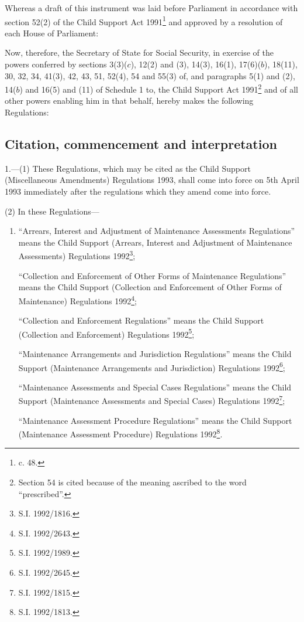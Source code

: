 \documentclass[12pt,a4paper]{article}
\title{\regstitle}
\author{S.I. 1993 No. 913}
\date{Made 29th March 1993\\Coming into force 5th April 1993}
\begin{document}
\maketitle

\noindent
Whereas a draft of this instrument was laid before Parliament in accordance with section 52(2) of the Child Support Act 1991\footnote{ c. 48.} and approved by a resolution of each House of Parliament: 

Now, therefore, the Secretary of State for Social Security, in exercise of the powers conferred by sections 3(3)($c$), 12(2) and (3), 14(3), 16(1), 17(6)($b$), 18(11), 30, 32, 34, 41(3), 42, 43, 51, 52(4), 54 and 55(3) of, and paragraphs 5(1) and (2), 14($b$) and 16(5) and (11) of Schedule 1 to, the Child Support Act 1991\footnote{\frenchspacing Section 54 is cited because of the meaning ascribed to the word “prescribed”.} and of all other powers enabling him in that behalf, hereby makes the following Regulations:


{\sloppy

\tableofcontents

}

\setcounter{secnumdepth}{-2}

\subsection[1. Citation, commencement and interpretation]{Citation, commencement and interpretation}

1.—(1) These Regulations, which may be cited as the Child Support (Miscellaneous Amendments) Regulations 1993, shall come into force on 5th April 1993 immediately after the regulations which they amend come into force.

(2) In these Regulations---
\begin{enumerate}\item[]
“Arrears, Interest and Adjustment of Maintenance Assessments Regulations” means the Child Support (Arrears, Interest and Adjustment of Maintenance Assessments) Regulations 1992\footnote{\frenchspacing S.I. 1992/1816.};

“Collection and Enforcement of Other Forms of Maintenance Regulations” means the Child Support (Collection and Enforcement of Other Forms of Maintenance) Regulations 1992\footnote{\frenchspacing S.I. 1992/2643.};

“Collection and Enforcement Regulations” means the Child Support (Collection and Enforcement) Regulations 1992\footnote{\frenchspacing S.I. 1992/1989.};

“Maintenance Arrangements and Jurisdiction Regulations” means the Child Support (Maintenance Arrangements and Jurisdiction) Regulations 1992\footnote{\frenchspacing S.I. 1992/2645.};

“Maintenance Assessments and Special Cases Regulations” means the Child Support (Maintenance Assessments and Special Cases) Regulations 1992\footnote{\frenchspacing S.I. 1992/1815.};

“Maintenance Assessment Procedure Regulations” means the Child Support (Maintenance Assessment Procedure) Regulations 1992\footnote{\frenchspacing S.I. 1992/1813.}.
\end{enumerate}
\end{document}
